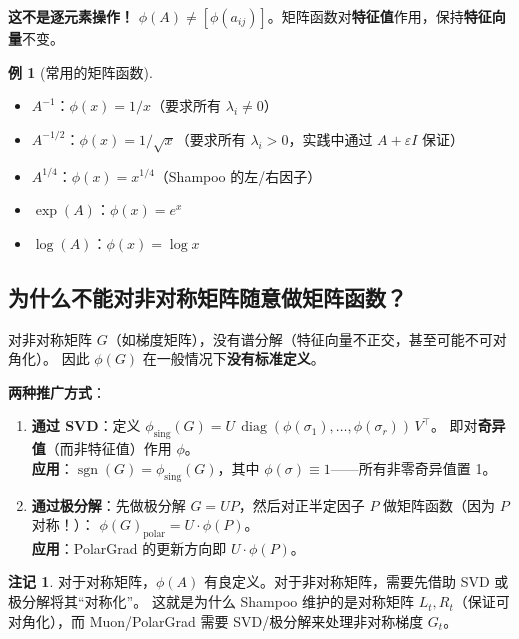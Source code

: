 \documentclass[12pt,a4paper]{ctexart}
\theoremstyle{definition}
\newtheorem{remark}{注记}[section]
\newtheorem{example}{例}[section]
\theoremstyle{plain}
\newcommand{\diag}{\operatorname{diag}}
\newcommand{\eps}{\varepsilon}
\DeclareMathOperator{\sgn}{sgn}
\begin{document}
\textbf{这不是逐元素操作！} $\phi(A)\neq[\phi(a_{ij})]$。矩阵函数对\textbf{特征值}作用，保持\textbf{特征向量}不变。

\begin{example}[常用的矩阵函数]
  \begin{itemize}
    \item $A^{-1}$：$\phi(x)=1/x$（要求所有 $\lambda_i\neq0$）
    \item $A^{-1/2}$：$\phi(x)=1/\sqrt{x}$（要求所有 $\lambda_i>0$，实践中通过 $A+\eps I$ 保证）
    \item $A^{1/4}$：$\phi(x)=x^{1/4}$（Shampoo 的左/右因子）
    \item $\exp(A)$：$\phi(x)=e^x$
    \item $\log(A)$：$\phi(x)=\log x$
  \end{itemize}
\end{example}

\subsection{为什么不能对非对称矩阵随意做矩阵函数？}

对非对称矩阵 $G$（如梯度矩阵），没有谱分解（特征向量不正交，甚至可能不可对角化）。
因此 $\phi(G)$ 在一般情况下\textbf{没有标准定义}。

\vspace{0.2cm}
\textbf{两种推广方式}：

\begin{enumerate}[label=(\arabic*)]
  \item \textbf{通过 SVD}：定义 $\phi_{\text{sing}}(G) = U\,\diag(\phi(\sigma_1),\ldots,\phi(\sigma_r))\,V^\top$。
  即对\textbf{奇异值}（而非特征值）作用 $\phi$。\\
  \textbf{应用}：$\sgn(G)=\phi_{\text{sing}}(G)$，其中 $\phi(\sigma)\equiv1$——所有非零奇异值置 1。

  \item \textbf{通过极分解}：先做极分解 $G=UP$，然后对正半定因子 $P$ 做矩阵函数（因为 $P$ 对称！）：
  $\phi(G)_{\text{polar}} = U\cdot\phi(P)$。\\
  \textbf{应用}：PolarGrad 的更新方向即 $U\cdot\phi(P)$。
\end{enumerate}

\begin{remark}
  对于对称矩阵，$\phi(A)$ 有良定义。对于非对称矩阵，需要先借助 SVD 或极分解将其``对称化''。
  这就是为什么 Shampoo 维护的是对称矩阵 $L_t,R_t$（保证可对角化），而 Muon/PolarGrad 需要 SVD/极分解来处理非对称梯度 $G_t$。
\end{remark}
\end{document}
